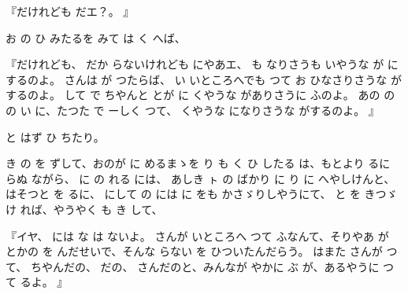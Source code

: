 
『だけれども
だエ？。
』

お
の
ひ
みたるを
みて
は
く
へば、

『だけれども、
だか
らないけれども
にやあエ、
も
なりさうも
いやうな
が
にするのよ。
さんは
が
つたらば、
い
いところへでも
つて
お
ひなさりさうな
がするのよ。
して
で
ちやんと
とが
に
くやうな
がありさうに
ふのよ。
あの
の
の
い
に、たつた
で
ーしく
つて、
くやうな
になりさうな
がするのよ。
』

と
はず
ひ
ちたり。

き
の
を
ずして、おのが
に
めるまゝを
り
も
く
ひ
したる
は、もとより
るに
らぬ
ながら、
に
の
れる
には、
あしき
ㇳ
の
ばかり
に
り
に
へやしけんと、
はそつと
を
るに、
にして
の
には
に
をも
かさゞりしやうにて、
と
を
きつゞけ
れば、やうやく
も
き
して、

『イヤ、
には
な
は
ないよ。
さんが
いところへ
つて
ふなんて、そりやあ
が
とかの
を
んだせいで、そんな
らない
を
ひついたんだらう。
はまた
さんが
つて、
ちやんだの、
だの、
さんだのと、みんなが
やかに
ぶ
が、あるやうに
つて
るよ。
』


